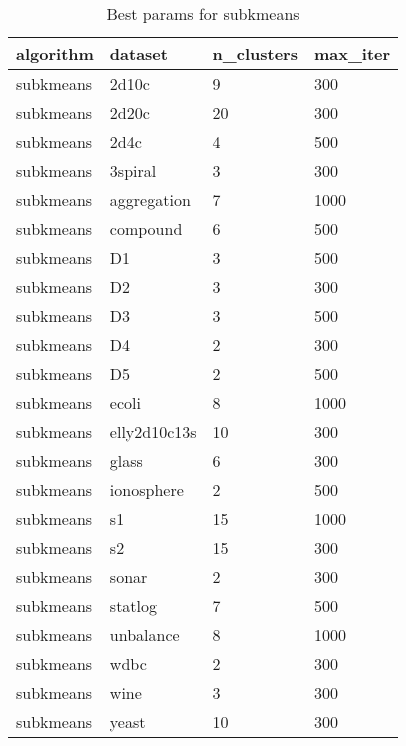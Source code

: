\begin{table}[H]
\centering
\caption{Best params for subkmeans}
\label{tab:params:subkmeans}
\begin{tabular}{|l|l|l|l|}
\hline
algorithm & dataset & n\_clusters & max\_iter \\
\hline
subkmeans & 2d10c & 9 & 300 \\
\hline
subkmeans & 2d20c & 20 & 300 \\
\hline
subkmeans & 2d4c & 4 & 500 \\
\hline
subkmeans & 3spiral & 3 & 300 \\
\hline
subkmeans & aggregation & 7 & 1000 \\
\hline
subkmeans & compound & 6 & 500 \\
\hline
subkmeans & D1 & 3 & 500 \\
\hline
subkmeans & D2 & 3 & 300 \\
\hline
subkmeans & D3 & 3 & 500 \\
\hline
subkmeans & D4 & 2 & 300 \\
\hline
subkmeans & D5 & 2 & 500 \\
\hline
subkmeans & ecoli & 8 & 1000 \\
\hline
subkmeans & elly2d10c13s & 10 & 300 \\
\hline
subkmeans & glass & 6 & 300 \\
\hline
subkmeans & ionosphere & 2 & 500 \\
\hline
subkmeans & s1 & 15 & 1000 \\
\hline
subkmeans & s2 & 15 & 300 \\
\hline
subkmeans & sonar & 2 & 300 \\
\hline
subkmeans & statlog & 7 & 500 \\
\hline
subkmeans & unbalance & 8 & 1000 \\
\hline
subkmeans & wdbc & 2 & 300 \\
\hline
subkmeans & wine & 3 & 300 \\
\hline
subkmeans & yeast & 10 & 300 \\
\hline
\end{tabular}
\end{table}
